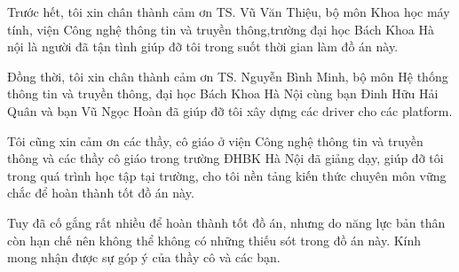 \cleardoublepage


\begin{acknowledgements}

Trước hết,  tôi xin chân thành cảm ơn TS. Vũ Văn Thiệu, bộ môn Khoa học máy tính, viện Công nghệ thông tin và truyền thông,trường đại học Bách Khoa Hà nội là người đã tận tình giúp đỡ tôi trong suốt thời gian làm đồ án này. 

Đồng thời, tôi xin chân thành cảm ơn TS. Nguyễn Bình Minh, bộ môn Hệ thống thông tin và truyền thông, đại học Bách Khoa Hà Nội cùng bạn Đinh Hữu Hải Quân và bạn Vũ Ngọc Hoàn đã giúp đỡ tôi xây dựng các driver cho các platform.

Tôi cũng xin cảm ơn các thầy, cô giáo ở viện Công nghệ thông tin và truyền thông và các thầy cô giáo trong trường ĐHBK Hà Nội đã giảng dạy, giúp đỡ tôi trong quá trình học tập tại trường, cho tôi nền tảng kiến thức chuyên môn vững chắc để hoàn thành tốt đồ án này. 

Tuy đã cố gắng rất nhiều để hoàn thành tốt đồ án, nhưng do năng lực bản thân còn hạn chế nên không thể không có những thiếu sót trong đồ án này. Kính mong nhận được sự góp ý của thầy cô và các bạn.


\end{acknowledgements}